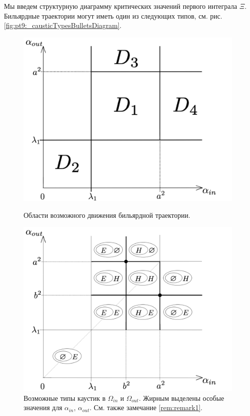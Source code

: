 Мы введем структурную диаграмму критических значений первого интеграла $\Xi$. 
Бильярдные траектории могут иметь один из следующих типов, см. рис. \ref{fig:pt9:_causticTypesBulletsDiagram}.
\begin{figure}[!htb]
\centering
\includegraphics[scale=0.1]{images/ch4/section2/causticTypesBulletsDiagram.pdf}
    \caption{Области возможного движения бильярдной траектории.}
    \label{fig:pt9:_causticTypesBulletsDiagram}
\endminipage\hfill
{}
\centering
\includegraphics[scale=0.1]{images/ch4/section2/problemAbifurcations.pdf}
    \caption{Возможные типы каустик в $\Omega_{in}$ и $\Omega_{out}$. Жирным выделены особые значения для $\alpha_{in}$, $\alpha_{out}$. См. также замечание \ref{rem:remark1}.}
    \label{fig:pt9:_problemAbifurcations}
\endminipage\hfill
\end{figure}

